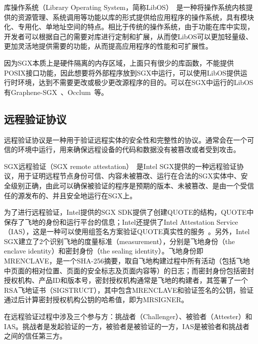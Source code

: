 库操作系统（Library Operating System，简称LibOS）~\cite{engler1995exokernel}是一种将操作系统内核提供的资源管理、系统调用等功能以库的形式提供给应用程序的操作系统，具有模块化、专用化、单地址空间的特点。相比于传统的操作系统，由于功能在库中实现，开发者可以根据自己的需要对库进行定制和扩展，从而使LibOS可以更加轻量级、更加灵活地提供需要的功能，从而提高应用程序的性能和可扩展性。

因为SGX本质上是硬件隔离的内存区域，上面只有很少的库函数，不能提供POSIX接口功能，因此想要将外部程序放到SGX中运行，可以使用LibOS提供运行时环境，达到不需要更改或极少更改源程序的目的。可以在SGX中运行的LibOS有Graphene-SGX~\cite{tsai2017graphene}、Occlum~\cite{shen2020occlum}等。

\subsection{远程验证协议}

远程验证协议是一种用于验证远程实体的安全性和完整性的协议。通常会在一个可信的环境中运行，用来确保远程设备的代码和数据没有被篡改或者受到攻击。

SGX远程验证（SGX remote attestation）~\cite{intel-sgx-ra}是Intel SGX提供的一种远程验证协议，用于证明远程节点身份可信、内容未被篡改、运行在合法的SGX实体中、安全级别正确，由此可以确保被验证的程序是预期的版本、未被篡改、是由一个受信任的源发布的、并且安全地运行在SGX上。

为了进行远程验证，Intel提供的SGX SDK提供了创建QUOTE的结构，QUOTE中保存了飞地的身份和运行平台的信息；Intel还提供了Intel Attestation Service（IAS），这是一种可以使用组签名方案验证QUOTE真实性的服务~\cite{intel-sgx-ra}。另外，Intel SGX建立了2个识别飞地的度量标准（measurement），分别是飞地身份（the enclave identity）和密封身份（the sealing identity）。飞地身份即MRENCLAVE，是一个SHA-256摘要，取自飞地构建过程中所有活动（包括飞地中页面的相对位置、页面的安全标志及页面内容等）的日志；而密封身份包括密封授权机构、产品ID和版本号，密封授权机构通常是飞地的构建者，其签署了一个RSA飞地证书（SIGSTRUCT），其中包含MRENCLAVE和验证签名的公钥，验证通过后计算密封授权机构公钥的哈希值，即为MRSIGNER。

在远程验证过程中涉及三个参与方：挑战者（Challenger）、被验者（Attester）和IAS。挑战者是发起验证的一方，被验者是被验证的一方，IAS是被验者和挑战者之间的信任第三方。

